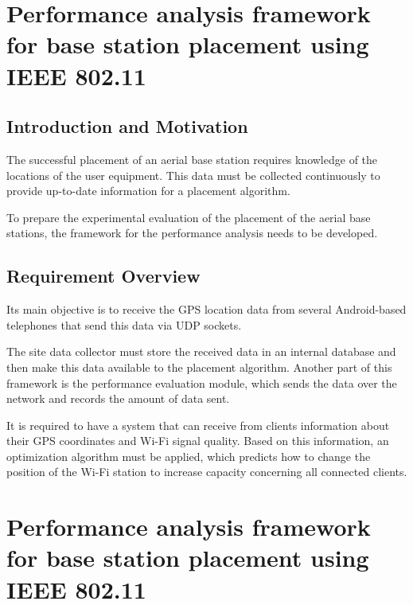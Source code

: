 \hypertarget{performance-analysis-framework-for-base-station-placement-using-ieee-802.11}{%
\section{Performance analysis framework for base station placement using
IEEE
802.11}\label{performance-analysis-framework-for-base-station-placement-using-ieee-802.11}}

\hypertarget{introduction-and-motivation}{%
\subsection{Introduction and
Motivation}\label{introduction-and-motivation}}

The successful placement of an aerial base station requires knowledge of
the locations of the user equipment. This data must be collected
continuously to provide up-to-date information for a placement
algorithm.

To prepare the experimental evaluation of the placement of the aerial
base stations, the framework for the performance analysis needs to be
developed.

\hypertarget{requirement-overview}{%
\subsection{Requirement Overview}\label{requirement-overview}}

Its main objective is to receive the GPS location data from several
Android-based telephones that send this data via UDP sockets.

The site data collector must store the received data in an internal
database and then make this data available to the placement algorithm.
Another part of this framework is the performance evaluation module,
which sends the data over the network and records the amount of data
sent.

It is required to have a system that can receive from clients
information about their GPS coordinates and Wi-Fi signal quality. Based
on this information, an optimization algorithm must be applied, which
predicts how to change the position of the Wi-Fi station to increase
capacity concerning all connected clients.

\hypertarget{performance-analysis-framework-for-base-station-placement-using-ieee-802.11-1}{%
\section{Performance analysis framework for base station placement using
IEEE
802.11}\label{performance-analysis-framework-for-base-station-placement-using-ieee-802.11-1}}

